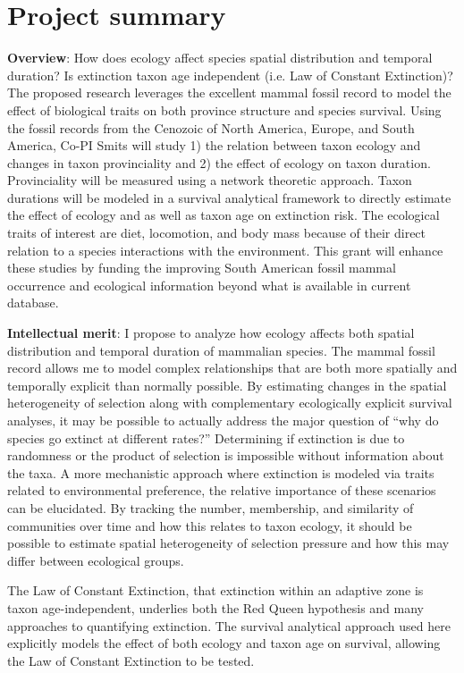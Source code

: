 \documentclass[11pt,letterpaper]{article}
\begin{document}
\setcounter{secnumdepth}{0}
\section{Project summary}

\textbf{Overview}:
How does ecology affect species spatial distribution and temporal duration? Is extinction taxon age independent (i.e. Law of Constant Extinction)? The proposed research leverages the excellent mammal fossil record to model the effect of biological traits on both province structure and species survival. Using the fossil records from the Cenozoic of North America, Europe, and South America, Co-PI Smits will study 1) the relation between taxon ecology and changes in taxon provinciality and 2) the effect of ecology on taxon duration. Provinciality will be measured using a network theoretic approach. Taxon durations will be modeled in a survival analytical framework to directly estimate the effect of ecology and as well as taxon age on extinction risk. The ecological traits of interest are diet, locomotion, and body mass because of their direct relation to a species interactions with the environment. This grant will enhance these studies by funding the improving South American fossil mammal occurrence and ecological information beyond what is available in current database.

\textbf{Intellectual merit}:
I propose to analyze how ecology affects both spatial distribution and temporal duration of mammalian species. The mammal fossil record allows me to model complex relationships that are both more spatially and temporally explicit than normally possible. By estimating changes in the spatial heterogeneity of selection along with complementary ecologically explicit survival analyses, it may be possible to actually address the major question of ``why do species go extinct at different rates?'' 
Determining if extinction is due to randomness or the product of selection is impossible without information about the taxa. A more mechanistic approach where extinction is modeled via traits related to environmental preference, the relative importance of these scenarios can be elucidated. By tracking the number, membership, and similarity of communities over time and how this relates to taxon ecology, it should be possible to estimate spatial heterogeneity of selection pressure and how this may differ between ecological groups.

The Law of Constant Extinction, that extinction within an adaptive zone is taxon age-independent, underlies both the Red Queen hypothesis and many approaches to quantifying extinction. 
The survival analytical approach used here explicitly models the effect of both ecology and taxon age on survival, allowing the Law of Constant Extinction to be tested.
\end{document}
